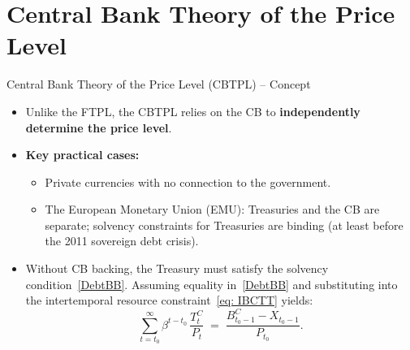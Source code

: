 \documentclass[11pt,aspectratio=169]{beamer}
\begin{document}
\section{Central Bank Theory of the Price Level}

\begin{frame}{Central Bank Theory of the Price Level (CBTPL) – Concept}

\begin{itemize}

  \item Unlike the FTPL, the CBTPL relies on the CB to \textbf{independently determine the price level}.

  \vspace{0.25cm}
  \item \textbf{Key practical cases:}
  \begin{itemize}
    \item Private currencies with no connection to the government.
    \item The European Monetary Union (EMU): Treasuries and the CB are separate; 
    solvency constraints for Treasuries are binding (at least before the 2011 sovereign debt crisis).
  \end{itemize}

  \vspace{0.25cm}
  \item Without CB backing, the Treasury must satisfy the solvency condition~\eqref{DebtBB}.  
  Assuming equality in~\eqref{DebtBB} and substituting into the intertemporal resource constraint~\eqref{eq: IBCTT} yields:
  \begin{equation}
    \sum_{t=t_{0}}^{\infty} \beta^{t-t_{0}}\,\frac{T_t^C}{P_t}
    \;=\;
    \frac{B_{t_0-1}^C - X_{t_0-1}}{P_{t_0}}.
    \label{eq:IBCCB}
  \end{equation}

\end{itemize}
\end{frame}
\end{document}
